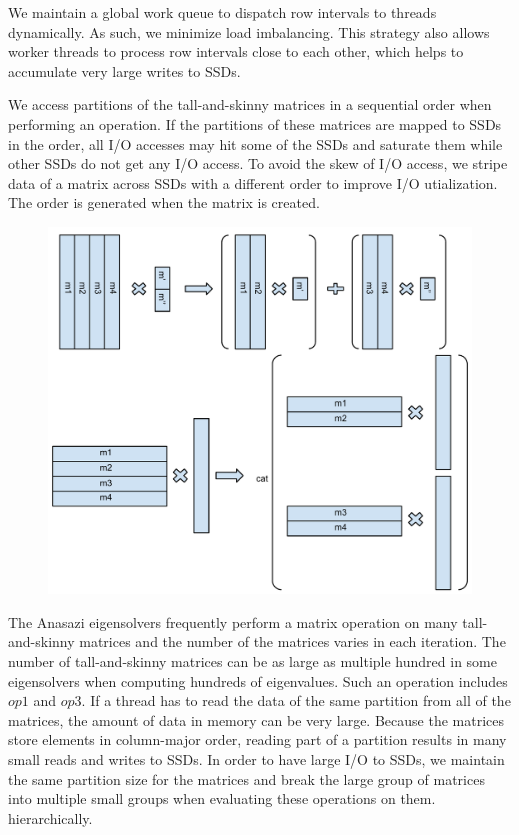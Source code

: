 We maintain a global work queue to dispatch row intervals to threads dynamically.
As such, we minimize load imbalancing. This strategy also allows worker threads
to process row intervals close to each other, which helps to accumulate very large
writes to SSDs.


We access partitions of the tall-and-skinny matrices in a sequential order
when performing an operation. If the partitions of these matrices are mapped
to SSDs in the order, all I/O accesses may hit some of the SSDs and saturate
them while other SSDs do not get any I/O access. To avoid the skew of I/O access,
we stripe data of a matrix across SSDs with a different order to improve I/O
utialization. The order is generated when the matrix is created.

\begin{figure}
\centering
\includegraphics[scale=0.4]{./mat_group.pdf}
\vspace{-5pt}
\caption{}
\vspace{-5pt}
\label{fig:mat_group}
\end{figure}

The Anasazi eigensolvers frequently perform a matrix operation on many
tall-and-skinny matrices and the number of the matrices varies in each iteration.
The number of tall-and-skinny matrices can be as large as multiple hundred
in some eigensolvers when computing hundreds of eigenvalues.
Such an operation includes $op1$ and $op3$. If a thread has to read the data
of the same partition from all of the matrices, the amount of data in memory
can be very large. Because the matrices store elements in column-major order,
reading part of a partition results in many small reads and writes to SSDs.
In order to have large I/O to SSDs, we maintain the same partition size for
the matrices and break the large group of matrices into multiple small groups
when evaluating these operations on them.
hierarchically.

